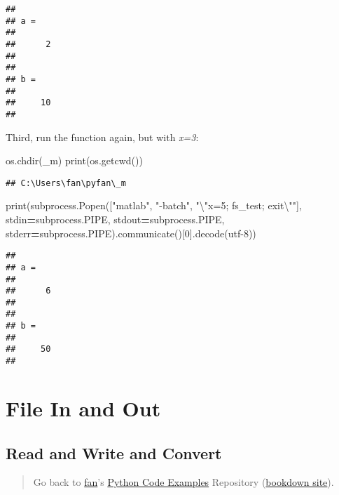 \documentclass[
]{book}
\newenvironment{Shaded}{\begin{snugshade}}{\end{snugshade}}
\newcommand{\BuiltInTok}[1]{#1}
\newcommand{\CharTok}[1]{\textcolor[rgb]{0.31,0.60,0.02}{#1}}
\newcommand{\DecValTok}[1]{\textcolor[rgb]{0.00,0.00,0.81}{#1}}
\newcommand{\NormalTok}[1]{#1}
\newcommand{\OperatorTok}[1]{\textcolor[rgb]{0.81,0.36,0.00}{\textbf{#1}}}
\newcommand{\StringTok}[1]{\textcolor[rgb]{0.31,0.60,0.02}{#1}}
\begin{document}
\begin{verbatim}
## 
## a =
## 
##      2
## 
## 
## b =
## 
##     10
## 
\end{verbatim}

Third, run the function again, but with \emph{x=3}:

\begin{Shaded}
\begin{Highlighting}[]
\NormalTok{os.chdir(}\StringTok{\textquotesingle{}\_m\textquotesingle{}}\NormalTok{)}
\BuiltInTok{print}\NormalTok{(os.getcwd())}
\end{Highlighting}
\end{Shaded}

\begin{verbatim}
## C:\Users\fan\pyfan\_m
\end{verbatim}

\begin{Shaded}
\begin{Highlighting}[]
\BuiltInTok{print}\NormalTok{(subprocess.Popen([}\StringTok{"matlab"}\NormalTok{, }\StringTok{"{-}batch"}\NormalTok{, }\StringTok{"}\CharTok{\textbackslash{}"}\StringTok{x=5; fs\_test; exit}\CharTok{\textbackslash{}"}\StringTok{"}\NormalTok{],}
\NormalTok{                       stdin}\OperatorTok{=}\NormalTok{subprocess.PIPE,}
\NormalTok{                       stdout}\OperatorTok{=}\NormalTok{subprocess.PIPE,}
\NormalTok{                       stderr}\OperatorTok{=}\NormalTok{subprocess.PIPE).communicate()[}\DecValTok{0}\NormalTok{].decode(}\StringTok{\textquotesingle{}utf{-}8\textquotesingle{}}\NormalTok{))}
\end{Highlighting}
\end{Shaded}

\begin{verbatim}
## 
## a =
## 
##      6
## 
## 
## b =
## 
##     50
## 
\end{verbatim}

\hypertarget{file-in-and-out}{%
\section{File In and Out}\label{file-in-and-out}}

\hypertarget{read-and-write-and-convert}{%
\subsection{Read and Write and Convert}\label{read-and-write-and-convert}}

\begin{quote}
Go back to \href{http://fanwangecon.github.io/}{fan}'s \href{https://fanwangecon.github.io/pyfan/}{Python Code Examples} Repository (\href{https://fanwangecon.github.io/pyfan/bookdown}{bookdown site}).
\end{quote}
\end{document}
